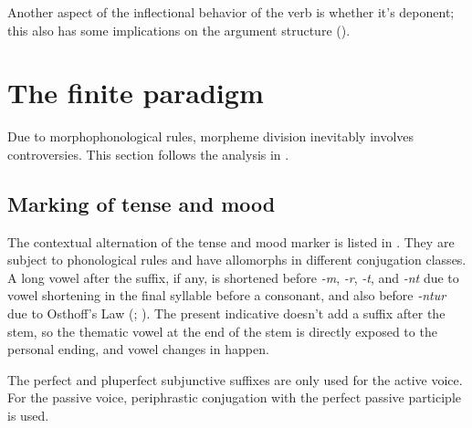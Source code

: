 \documentclass[a4paper, oneside, 12pt]{report}
\newcommand*{\citechap}[1]{chap.~{#1}}
\newcommand*{\citepage}[1]{p.~{#1}}
\newcommand{\form}[1]{\emph{#1}}
\begin{document}
Another aspect of the inflectional behavior of the verb
is whether it's deponent;
this also has some implications on 
the argument structure ().

\section{The finite paradigm}\label{sec:finite-paradigm}

Due to morphophonological rules, 
morpheme division inevitably involves controversies.
This section follows the analysis in \citet[\citechap{14}]{oniga2014latin}.

\subsection{Marking of tense and mood}\label{sec:tense-mood-marking}

The contextual alternation of the tense and mood marker is listed in
.
They are subject to phonological rules 
and have allomorphs in different conjugation classes. 
A long vowel after the suffix,
if any, is shortened before \form{-m}, \form{-r}, \form{-t}, and \form{-nt}
due to vowel shortening in the final syllable before a consonant,
and also before \form{-ntur} due to Osthoff's Law 
(; 
\citealt[\citepage{130}]{oniga2014latin}).
The present indicative doesn't add a suffix after the stem, 
so the thematic vowel at the end of the stem 
is directly exposed to the personal ending,
and vowel changes in  happen.

The perfect and pluperfect subjunctive suffixes 
are only used for the active voice.
For the passive voice,
periphrastic conjugation with the perfect passive participle is used.
\end{document}
